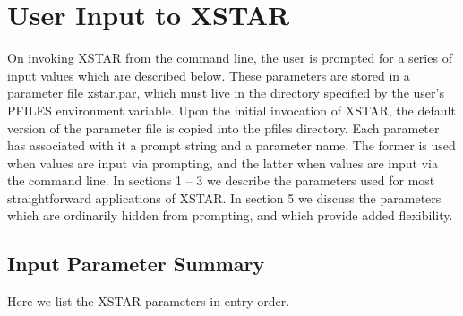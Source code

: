 \chapter{User Input to XSTAR}
\label{sec:xstarinput}

On invoking XSTAR from the 
command line, the user is prompted for a series of input values which 
are described below.  These parameters are stored in a parameter file
xstar.par, which must live in the directory specified by the 
user's PFILES environment variable.  Upon the initial invocation of 
XSTAR, the default version of the parameter file is copied into the 
pfiles directory.  Each parameter has associated 
with it a prompt string and a parameter name.  The former is used 
when values are input via prompting, and the latter when values 
are input via the command line.  In sections 1 -- 3 we describe the 
parameters used for most straightforward applications of XSTAR.  In section 5
we discuss the parameters which are ordinarily hidden from prompting, and 
which provide added flexibility.

\section{Input Parameter Summary}

Here we list the XSTAR parameters in entry order.

